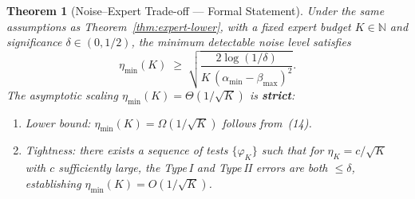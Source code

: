 \documentclass[12pt,a4paper]{article}
\newtheorem{theorem}{Theorem}[section]
\newcommand{\etamin}{\eta_{\min}}
\begin{document}
\begin{theorem}[Noise--Expert Trade-off --- Formal Statement]
\label{thm:noise-expert}
Under the same assumptions as Theorem~\ref{thm:expert-lower}, with a fixed
expert budget $K\in\mathbb{N}$ and significance $\delta\in(0,1/2)$, the minimum
detectable noise level satisfies
\begin{equation}\label{eq:eta-min}
    \etamin(K) \;\geq\;
    \sqrt{\frac{2\log(1/\delta)}
               {K\,(\alpha_{\min}-\beta_{\max})^{2}}}.
\end{equation}
The asymptotic scaling $\etamin(K)=\Theta(1/\sqrt{K})$ is \textbf{strict}:
\begin{enumerate}[label=(\roman*)]
    \item \emph{Lower bound:} $\etamin(K)=\Omega(1/\sqrt{K})$ follows from~(14).
    \item \emph{Tightness:} there exists a sequence of tests $\{\varphi_K\}$
          such that for $\eta_K = c/\sqrt{K}$ with $c$ sufficiently large,
          the Type\,I and Type\,II errors are both $\leq\delta$, establishing
          $\etamin(K)=O(1/\sqrt{K})$.
\end{enumerate}
\end{theorem}
\end{document}
